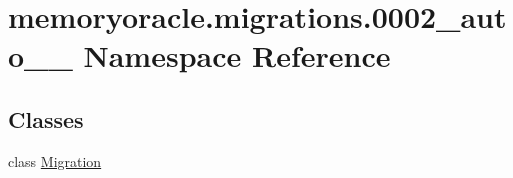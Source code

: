 \hypertarget{namespacememoryoracle_1_1migrations_1_10002__auto__20150402__2000}{}\section{memoryoracle.\+migrations.0002\+\_\+auto\+\_\+\_ Namespace Reference}
\label{namespacememoryoracle_1_1migrations_1_10002__auto__20150402__2000}
\subsection*{Classes}
\begin{DoxyCompactItemize}
\item 
class \hyperlink{classmemoryoracle_1_1migrations_1_10002__auto__20150402__2000_1_1Migration}{Migration}
\end{DoxyCompactItemize}
